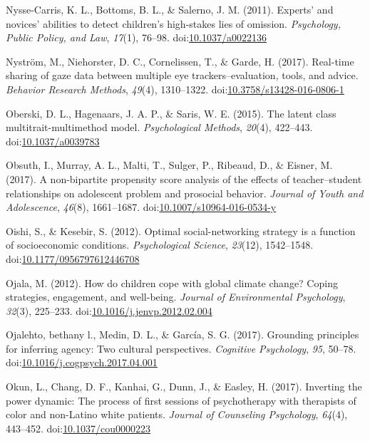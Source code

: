 \documentclass[english,man]{apa6}
\begin{document}
\hypertarget{ref-Nysse-Carris2011}{}
Nysse-Carris, K. L., Bottoms, B. L., \& Salerno, J. M. (2011). Experts'
and novices' abilities to detect children's high-stakes lies of
omission. \emph{Psychology, Public Policy, and Law}, \emph{17}(1),
76--98. doi:\href{https://doi.org/10.1037/a0022136}{10.1037/a0022136}

\hypertarget{ref-Nystrom2017}{}
Nyström, M., Niehorster, D. C., Cornelissen, T., \& Garde, H. (2017).
Real-time sharing of gaze data between multiple eye
trackers--evaluation, tools, and advice. \emph{Behavior Research
Methods}, \emph{49}(4), 1310--1322.
doi:\href{https://doi.org/10.3758/s13428-016-0806-1}{10.3758/s13428-016-0806-1}

\hypertarget{ref-Oberski2015}{}
Oberski, D. L., Hagenaars, J. A. P., \& Saris, W. E. (2015). The latent
class multitrait-multimethod model. \emph{Psychological Methods},
\emph{20}(4), 422--443.
doi:\href{https://doi.org/10.1037/a0039783}{10.1037/a0039783}

\hypertarget{ref-Obsuth2017}{}
Obsuth, I., Murray, A. L., Malti, T., Sulger, P., Ribeaud, D., \&
Eisner, M. (2017). A non-bipartite propensity score analysis of the
effects of teacher--student relationships on adolescent problem and
prosocial behavior. \emph{Journal of Youth and Adolescence},
\emph{46}(8), 1661--1687.
doi:\href{https://doi.org/10.1007/s10964-016-0534-y}{10.1007/s10964-016-0534-y}

\hypertarget{ref-Oishi2012}{}
Oishi, S., \& Kesebir, S. (2012). Optimal social-networking strategy is
a function of socioeconomic conditions. \emph{Psychological Science},
\emph{23}(12), 1542--1548.
doi:\href{https://doi.org/10.1177/0956797612446708}{10.1177/0956797612446708}

\hypertarget{ref-Ojala2012}{}
Ojala, M. (2012). How do children cope with global climate change?
Coping strategies, engagement, and well-being. \emph{Journal of
Environmental Psychology}, \emph{32}(3), 225--233.
doi:\href{https://doi.org/10.1016/j.jenvp.2012.02.004}{10.1016/j.jenvp.2012.02.004}

\hypertarget{ref-Ojalehto2017}{}
Ojalehto, bethany l., Medin, D. L., \& García, S. G. (2017). Grounding
principles for inferring agency: Two cultural perspectives.
\emph{Cognitive Psychology}, \emph{95}, 50--78.
doi:\href{https://doi.org/10.1016/j.cogpsych.2017.04.001}{10.1016/j.cogpsych.2017.04.001}

\hypertarget{ref-Okun2017}{}
Okun, L., Chang, D. F., Kanhai, G., Dunn, J., \& Easley, H. (2017).
Inverting the power dynamic: The process of first sessions of
psychotherapy with therapists of color and non-Latino white patients.
\emph{Journal of Counseling Psychology}, \emph{64}(4), 443--452.
doi:\href{https://doi.org/10.1037/cou0000223}{10.1037/cou0000223}
\end{document}
